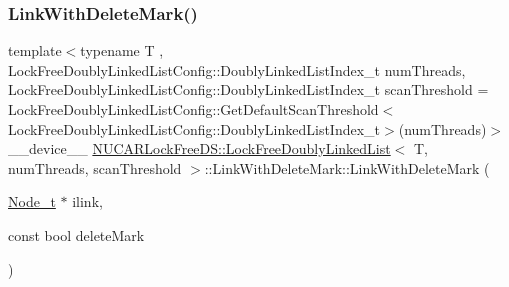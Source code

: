 \subsubsection{\texorpdfstring{Link\+With\+Delete\+Mark()}{LinkWithDeleteMark()}\hspace{0.1cm}{\footnotesize\ttfamily [1/5]}}
{\footnotesize\ttfamily template$<$typename T , Lock\+Free\+Doubly\+Linked\+List\+Config\+::\+Doubly\+Linked\+List\+Index\+\_\+t num\+Threads, Lock\+Free\+Doubly\+Linked\+List\+Config\+::\+Doubly\+Linked\+List\+Index\+\_\+t scan\+Threshold = Lock\+Free\+Doubly\+Linked\+List\+Config\+::\+Get\+Default\+Scan\+Threshold$<$\+Lock\+Free\+Doubly\+Linked\+List\+Config\+::\+Doubly\+Linked\+List\+Index\+\_\+t$>$(num\+Threads)$>$ \\
\+\_\+\+\_\+device\+\_\+\+\_\+ \mbox{\hyperlink{class_n_u_c_a_r_lock_free_d_s_1_1_lock_free_doubly_linked_list}{N\+U\+C\+A\+R\+Lock\+Free\+D\+S\+::\+Lock\+Free\+Doubly\+Linked\+List}}$<$ T, num\+Threads, scan\+Threshold $>$\+::Link\+With\+Delete\+Mark\+::\+Link\+With\+Delete\+Mark (\begin{DoxyParamCaption}\item[{\mbox{\hyperlink{class_n_u_c_a_r_lock_free_d_s_1_1_lock_free_doubly_linked_list_abb8fd1da564d74028552e980bc99a704}{Node\+\_\+t}} $\ast$}]{ilink,  }\item[{const bool}]{delete\+Mark }\end{DoxyParamCaption})\hspace{0.3cm}{\ttfamily [inline]}}

\mbox{\label{class_n_u_c_a_r_lock_free_d_s_1_1_lock_free_doubly_linked_list_1_1_link_with_delete_mark_aedead35ab7fcb097d8bfdaf1178afb1c}} 
